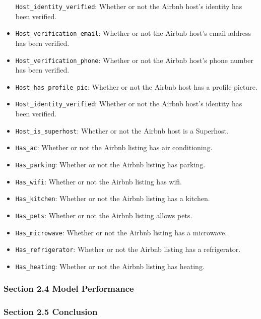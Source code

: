 \documentclass[
  letterpaper,
  DIV=11,
  numbers=noendperiod]{scrartcl}
\begin{document}
\begin{itemize}
  \texttt{Host\_identity\_verified}: Whether or not the Airbnb host's
  identity has been verified.
\item
  \texttt{Host\_verification\_email}: Whether or not the Airbnb host's
  email address has been verified.
\item
  \texttt{Host\_verification\_phone}: Whether or not the Airbnb host's
  phone number has been verified.
\item
  \texttt{Host\_has\_profile\_pic}: Whether or not the Airbnb host has a
  profile picture.
\item
  \texttt{Host\_identity\_verified}: Whether or not the Airbnb host's
  identity has been verified.
\item
  \texttt{Host\_is\_superhost}: Whether or not the Airbnb host is a
  Superhost.
\item
  \texttt{Has\_ac}: Whether or not the Airbnb listing has air
  conditioning.
\item
  \texttt{Has\_parking}: Whether or not the Airbnb listing has parking.
\item
  \texttt{Has\_wifi}: Whether or not the Airbnb listing has wifi.
\item
  \texttt{Has\_kitchen}: Whether or not the Airbnb listing has a
  kitchen.
\item
  \texttt{Has\_pets}: Whether or not the Airbnb listing allows pets.
\item
  \texttt{Has\_microwave}: Whether or not the Airbnb listing has a
  microwave.
\item
  \texttt{Has\_refrigerator}: Whether or not the Airbnb listing has a
  refrigerator.
\item
  \texttt{Has\_heating}: Whether or not the Airbnb listing has heating.
\end{itemize}

\hypertarget{section-2.4-model-performance}{%
\subsubsection{Section 2.4 Model
Performance}\label{section-2.4-model-performance}}

\hypertarget{section-2.5-conclusion}{%
\subsubsection{Section 2.5 Conclusion}\label{section-2.5-conclusion}}
\end{document}
